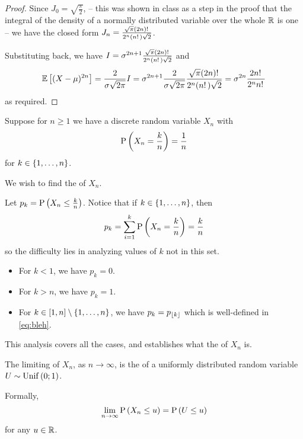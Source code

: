 \documentclass[11pt]{article}
\begin{document}
\begin{proof}
    Since $J_0 = \sqrt{\frac{\pi}{2}}$,
    --
    this was shown in class as a step in the proof that the integral of the
    density of a normally distributed variable over the whole $\R$ is one
    --
    \newcommand{\jn}{\frac{\sqrt{\pi}(2n)\fact}{2^n (n\fact) \sqrt{2}}}
    we have the closed form $J_n = \jn$.

    Substituting back, we have $I = \sigma^{2n+1} \jn$
    and
    \begin{equation*}
        \E{(X-\mu)^{2n}}
        = \bleh[2] I
        = \sigma^{2n+1} \bleh[2] \jn
        = \sigma^{2n} \frac{2n\fact}{2^n n\fact}
    \end{equation*}
    as required.
\end{proof}


Suppose for $n \geq 1$ we have a discrete random variable $X_n$ with \pmf{}
%
\begin{equation*}
    \P{X_n = \frac{k}{n}} = \frac{1}{n}
\end{equation*}
%
for $k \in \range{n}$.

We wish to find the \cdf{} of $X_n$.

Let $p_k = \P{X_n \leq \frac{k}{n}}$.
Notice that if $k \in \range{n}$, then
%
\begin{equation}
    \label{eq:bleh}
    p_k
    = \sum_{i=1}^k \P{X_n = \frac{k}{n}}
    = \frac{k}{n}
\end{equation}
%
so the difficulty lies in analyzing values of $k$ not in this set.

\begin{itemize}
    \item
        For $k < 1$, we have $p_k = 0$.
    \item
        For $k > n$, we have $p_k = 1$.
    \item
        For $k \in [1, n] \setminus \range{n}$,
        we have $p_k = p_{\floor{k}}$
        which is well-defined in \eqref{eq:bleh}.
\end{itemize}

This analysis covers all the cases, and establishes what the \cdf{} of $X_n$
is.

\begin{prop}
    The limiting \cdf{} of $X_n$, as $n \to \infty$, is the \cdf{} of a
    uniformly distributed random variable $U \sim \Unif{0;1}$.

    Formally,
    \begin{equation*}
        \lim_{n\to\infty} \P{X_n \leq u} = \P{U \leq u}
    \end{equation*}
    for any $u \in \R$.
\end{prop}
\end{document}
